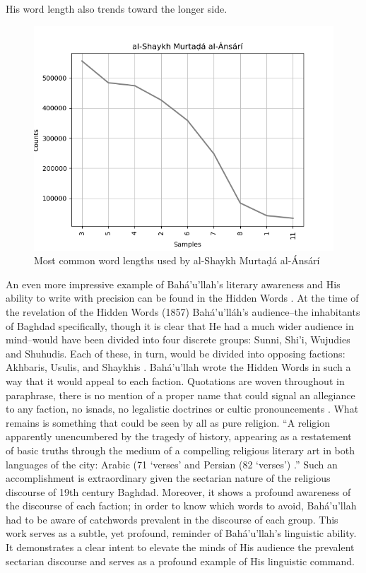 \documentclass[12pt, oneside]{report}
\begin{document}
His word length also trends toward the longer side.
\begin{figure}[htb]
	\centering
	\includegraphics[width=15cm]{figures/word-length-shaykh-murtada.png}
	\caption[Most common word lengths used by al-Shaykh Murtaḍ\'{a} al-\'{A}ns\'{a}r\'{i}]{Most common word lengths used by al-Shaykh Murtaḍ\'{a} al-\'{A}ns\'{a}r\'{i}}
	\label{fig:word-length-murtada-ansari}
\end{figure}
\par
An even more impressive example of Bah\'{a}'u'llah's literary awareness and His ability to write with precision can be found in the Hidden Words \cite{bahaullah_hidden_2002}. At the time of the revelation of the Hidden Words (1857) Bahá'u'lláh's audience–the inhabitants of Baghdad specifically, though it is clear that He had a much wider audience in mind–would have been divided into four discrete groups: Sunni, Shi'i, Wujudies and Shuhudis. Each of these, in turn, would be divided into opposing factions: Akhbaris, Usulis, and Shaykhis \cite{lawson_todd_globalization_2005}. Bah\'{a}'u'llah wrote the Hidden Words in such a way that it would appeal to each faction. Quotations are woven throughout in paraphrase, there is no mention of a proper name that could signal an allegiance to any faction, no isnads, no legalistic doctrines or cultic pronouncements \cite{lawson_todd_globalization_2005}. What remains is something that could be seen by all as pure religion. ``A religion apparently unencumbered by the tragedy of history, appearing as a restatement of basic truths through the medium of a compelling religious literary art in both languages of the city: Arabic (71 `verses' and Persian (82 `verses') \cite{lawson_todd_globalization_2005}.'' Such an accomplishment is extraordinary given the sectarian nature of the religious discourse of 19th century Baghdad. Moreover, it shows a profound awareness of the discourse of each faction; in order to know which words to avoid, Bah\'{a}'u'llah had to be aware of catchwords prevalent in the discourse of each group. This work serves as a subtle, yet profound, reminder of Bah\'{a}'u'llah's linguistic ability. It demonstrates a clear intent to elevate the minds of His audience the prevalent sectarian discourse and serves as a profound example of His linguistic command.
\end{document}
